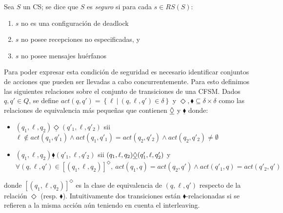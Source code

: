 \begin{definition}[CS seguro] \label{def:safeCS} Sea $S$ un CS; se dice que $S$ es \emph{seguro} si para cada $s \in RS(S)$:
\begin{enumerate}
\item $s$ no es una configuración de deadlock 
\item $s$ no posee recepciones no especificadas, y
\item $s$ no posee mensajes huérfanos  
\end{enumerate} 

Para poder expresar esta condición de seguridad es necesario identificar conjuntos de acciones que pueden ser llevadas a cabo concurrentemente. Para esto definimos las siguientes relaciones sobre el conjunto de transiciones de una CFSM. Dados $q, q' \in Q$, se define $\mathit{act}(q,q') = \left\{\ell \ \left|\right. \ (q,\ell,q') \in \delta \right\}$ y $\Diamond, \blacklozenge \subseteq \delta \times \delta$ como las relaciones de equivalencia más pequeñas que contienen $\underline{\Diamond}$ y $\underline{\blacklozenge}$ donde:
\begin{itemize}
\item $(q_1, \ell, q_2) \underline{\Diamond} (q'_1, \ell, q'_2)$ sii $ \ell \notin \mathit{act}(q_1, q'_1) \land \mathit{act}(q_1, q'_1) = \mathit{act}(q_2, q'_2) \land \mathit{act}(q_2, q'_2) \neq \emptyset $
\item  $(q_1, \ell, q_2) \underline{\blacklozenge} (q'_1, \ell, q'_2)$ sii $ (q_1, \ell, q_2) \underline{\Diamond} (q'_1, \ell, q'_2) $ y $\forall(q,\ell,q') \in [(q_1, \ell, q_2) ]^{\Diamond}, \ \mathit{act}(q_1,q) = \mathit{act}(q_2,q') \land \mathit{act}(q'_1,q) = \mathit{act}(q'_2,q')$  
\end{itemize}
donde $[(q_1, \ell, q_2) ]^{\Diamond}$ es la clase de equivalencia de $(q, \ell, q')$ respecto de la relación $\Diamond$ (resp. $\blacklozenge$). Intuitivamente dos transiciones están $\blacklozenge$-relacionadas si se refieren a la misma acción aún teniendo en cuenta el interleaving.
\end{definition} 

